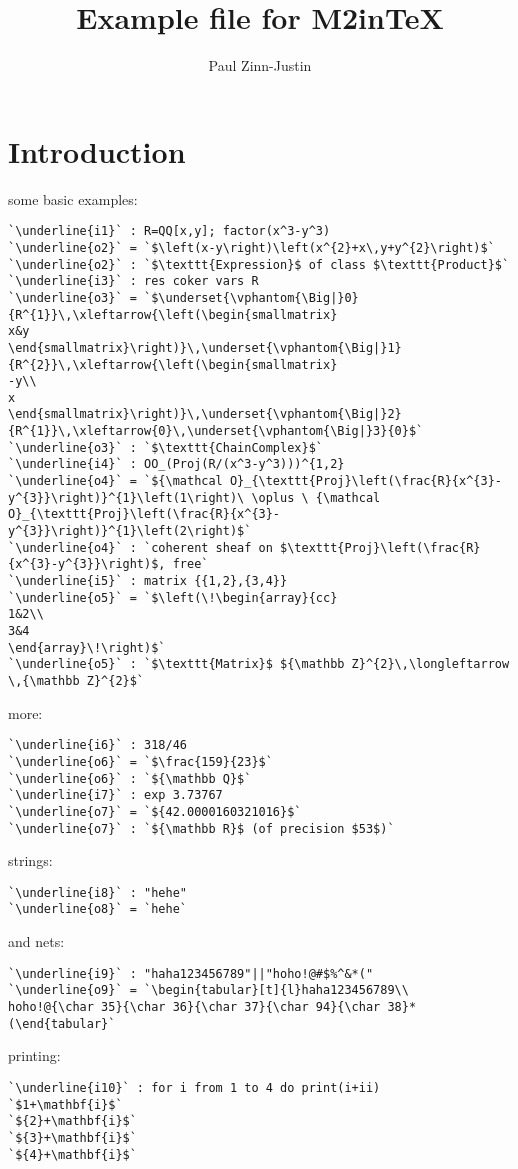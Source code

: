 \documentclass[12pt,a4paper]{amsart}
\title{Example file for M2inTeX}
\author{Paul Zinn-Justin}
\begin{document}
\maketitle

\section{Introduction}
some basic examples:
\begin{lstlisting}[language=Macaulay2]
`\underline{i1}` : R=QQ[x,y]; factor(x^3-y^3)
`\underline{o2}` = `$\left(x-y\right)\left(x^{2}+x\,y+y^{2}\right)$`
`\underline{o2}` : `$\texttt{Expression}$ of class $\texttt{Product}$`
`\underline{i3}` : res coker vars R
`\underline{o3}` = `$\underset{\vphantom{\Big|}0}{R^{1}}\,\xleftarrow{\left(\begin{smallmatrix}
x&y
\end{smallmatrix}\right)}\,\underset{\vphantom{\Big|}1}{R^{2}}\,\xleftarrow{\left(\begin{smallmatrix}
-y\\
x
\end{smallmatrix}\right)}\,\underset{\vphantom{\Big|}2}{R^{1}}\,\xleftarrow{0}\,\underset{\vphantom{\Big|}3}{0}$`
`\underline{o3}` : `$\texttt{ChainComplex}$`
`\underline{i4}` : OO_(Proj(R/(x^3-y^3)))^{1,2}
`\underline{o4}` = `${\mathcal O}_{\texttt{Proj}\left(\frac{R}{x^{3}-y^{3}}\right)}^{1}\left(1\right)\ \oplus \ {\mathcal O}_{\texttt{Proj}\left(\frac{R}{x^{3}-y^{3}}\right)}^{1}\left(2\right)$`
`\underline{o4}` : `coherent sheaf on $\texttt{Proj}\left(\frac{R}{x^{3}-y^{3}}\right)$, free`
`\underline{i5}` : matrix {{1,2},{3,4}}
`\underline{o5}` = `$\left(\!\begin{array}{cc}
1&2\\
3&4
\end{array}\!\right)$`
`\underline{o5}` : `$\texttt{Matrix}$ ${\mathbb Z}^{2}\,\longleftarrow \,{\mathbb Z}^{2}$`\end{lstlisting}
more:
\begin{lstlisting}[language=Macaulay2]
`\underline{i6}` : 318/46
`\underline{o6}` = `$\frac{159}{23}$`
`\underline{o6}` : `${\mathbb Q}$`
`\underline{i7}` : exp 3.73767
`\underline{o7}` = `${42.0000160321016}$`
`\underline{o7}` : `${\mathbb R}$ (of precision $53$)`\end{lstlisting}
strings:
\begin{lstlisting}[language=Macaulay2]
`\underline{i8}` : "hehe"
`\underline{o8}` = `hehe`\end{lstlisting}
and nets:
\begin{lstlisting}[language=Macaulay2]
`\underline{i9}` : "haha123456789"||"hoho!@#$%^&*("
`\underline{o9}` = `\begin{tabular}[t]{l}haha123456789\\
hoho!@{\char 35}{\char 36}{\char 37}{\char 94}{\char 38}*(\end{tabular}`\end{lstlisting}
printing:
\begin{lstlisting}[language=Macaulay2]
`\underline{i10}` : for i from 1 to 4 do print(i+ii)
`$1+\mathbf{i}$`
`${2}+\mathbf{i}$`
`${3}+\mathbf{i}$`
`${4}+\mathbf{i}$`\end{lstlisting}
\end{document}
